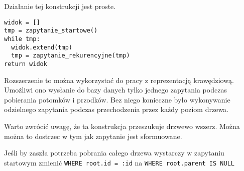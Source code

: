 Działanie tej konstrukcji jest proste.

\begin{verbatim}
widok = []
tmp = zapytanie_startowe()
while tmp:
  widok.extend(tmp)
  tmp = zapytanie_rekurencyjne(tmp)
return widok
\end{verbatim}

Rozszerzenie to można wykorzystać do pracy z reprezentacją krawędziową. 
Umożliwi ono wysłanie do bazy danych tylko jednego zapytania podczas pobierania potomków i przodków. 
Bez niego konieczne było wykonywanie odzielnego zapytania podczas przechodzenia przez każdy poziom drzewa.






Warto zwrócić uwagę, że ta konstrukcja przeszukuje drzwewo wszerz. Można można to dostrzec w tym jak zapytanie jest sformuowane. 

Jeśli by zaszła potrzeba pobrania całego drzewa wystarczy w zapytaniu startowym zmienić \texttt{WHERE root.id = :id} na \texttt{WHERE root.parent IS NULL}






